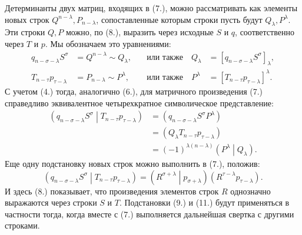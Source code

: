 \documentclass[11pt]{article}
\newcommand{\pair}[2]{\left(#1\middle|#2\right)}
\begin{document}
Детерминанты двух матриц, входящих в (7.), можно рассматривать как элементы новых строк $Q^{n-\lambda},P_{n-\lambda}$, сопоставленные которым строки пусть будут $Q_\lambda,P^\lambda$. Эти строки $Q,P$ можно, по (8.), выразить через исходные $S$ и $q$, соответственно через $T$ и $p$. Мы обозначаем это уравнениями:
\begin{equation}
\begin{aligned}
 q_{n-\sigma-\lambda}S^\sigma&=Q^{n-\lambda}\sim Q_\lambda,
 &\quad\text{или также}\quad Q_\lambda&=[q_{n-\sigma-\lambda}S^\sigma]_\lambda,\\
 T_{n-\tau}p_{\tau-\lambda}&=P_{n-\lambda}\sim P^\lambda,
 &\quad\text{или также}\quad P^\lambda&=[T_{n-\tau}p_{\tau-\lambda}]^\lambda.
\end{aligned}
\tag{9}
\end{equation}
С учетом (4.) тогда, аналогично (6.), для матричного произведения (7.) справедливо эквивалентное четырехкратное символическое представление:
\begin{equation}
\begin{aligned}
\pair{q_{n-\sigma-\lambda}S^\sigma}{T_{n-\tau}p_{\tau-\lambda}}
&=(q_{n-\sigma-\lambda}S^\sigma P^\lambda)\\
&=(Q_\lambda T_{n-\tau}p_{\tau-\lambda})\\
&=(-1)^{\lambda(n-\lambda)}\pair{P^\lambda}{Q_\lambda}.
\end{aligned}
\tag{10}
\end{equation}
Еще одну подстановку новых строк можно выполнить в (7.), положив:
\begin{equation}
 \pair{q_{n-\sigma-\lambda}S^\sigma}{T_{n-\tau}p_{\tau-\lambda}}
 =\pair{R^{\sigma+\lambda}}{p_{\sigma+\lambda}}(R^{\tau-\lambda}p_{\tau-\lambda}).
\tag{11}
\end{equation}
И здесь (8.) показывает, что произведения элементов строк $R$ однозначно выражаются через строки $S$ и $T$. Подстановки (9.) и (11.) будут применяться в частности тогда, когда вместе с (7.) выполняется дальнейшая свертка с другими строками.
\end{document}
